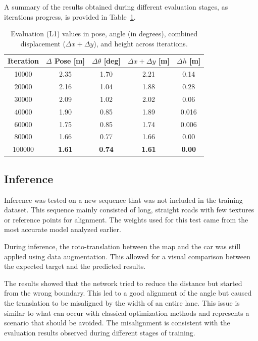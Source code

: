 A summary of the results obtained during different evaluation stages, as iterations progress, is provided in Table~\ref{tab:pose_variations_final_sumup}.

\begin{table}[H]
    \centering
    \scriptsize
    \renewcommand{\arraystretch}{1.2}
    \setlength{\tabcolsep}{10pt} 
    \begin{tabular}{c c c c c}
        \toprule
        \textbf{Iteration} & \textbf{$\Delta$ Pose [m]} & \textbf{$\Delta \theta$ [deg]} & \textbf{$\Delta x + \Delta y$ [m]} & \textbf{$\Delta h$ [m]} \\
        \midrule
        \num{10000}   & 2.35 & 1.70  & 2.21 & 0.14 \\
        \num{20000}   & 2.16 & 1.04  & 1.88 & 0.28 \\
        \num{30000}   & 2.09 & 1.02  & 2.02 & 0.06 \\
        \num{40000}   & 1.90 & 0.85  & 1.89 & 0.016 \\
        \num{60000}   & 1.75 & 0.85  & 1.74 & 0.006 \\
        \num{80000}   & 1.66 & 0.77  & 1.66 & 0.00 \\
        \num{100000}  & \textbf{1.61} & \textbf{0.74}  & \textbf{1.61} & \textbf{0.00} \\
        \bottomrule
    \end{tabular}
    \caption{Evaluation (L1) values in pose, angle (in degrees), combined displacement ($\Delta x + \Delta y$), and height across iterations.}
    \label{tab:pose_variations_final_sumup}
\end{table}

\subsection{Inference}
Inference was tested on a new sequence that was not included in the training dataset. This sequence mainly consisted of long, straight roads with few textures or reference points for alignment. The weights used for this test came from the most accurate model analyzed earlier.

During inference, the roto-translation between the map and the car was still applied using data augmentation. This allowed for a visual comparison between the expected target and the predicted results.

The results showed that the network tried to reduce the distance but started from the wrong boundary. This led to a good alignment of the angle but caused the translation to be misaligned by the width of an entire lane. This issue is similar to what can occur with classical optimization methods and represents a scenario that should be avoided. The misalignment is consistent with the evaluation results observed during different stages of training.

